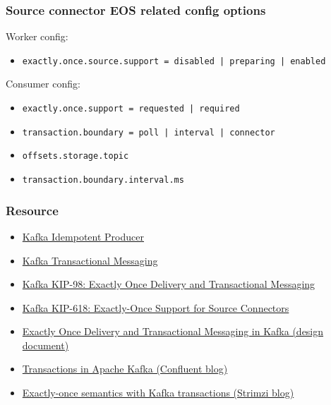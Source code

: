 \documentclass[10pt,utf8]{beamer}
\begin{document}
\begin{frame}
    \frametitle{Source connector EOS related config options}
    Worker config:
    \begin{itemize}
        \item \texttt{exactly.once.source.support = disabled | preparing | enabled}
    \end{itemize}
    
    \vspace{0.5cm}
    
    Consumer config:
    \begin{itemize}
     \item \texttt{exactly.once.support = requested | required}
     \item \texttt{transaction.boundary = poll | interval | connector}
     \item \texttt{offsets.storage.topic}
     \item \texttt{transaction.boundary.interval.ms}
    \end{itemize}
\end{frame}

\begin{frame}
    \frametitle{Resource}
    \begin{itemize}
        \color{blue}
        \item \href{https://cwiki.apache.org/confluence/display/KAFKA/Idempotent+Producer}{Kafka Idempotent Producer}
        \item \href{https://cwiki.apache.org/confluence/display/KAFKA/Transactional+Messaging+in+Kafka}{Kafka Transactional Messaging}
        \item \href{https://cwiki.apache.org/confluence/display/KAFKA/KIP-98+-+Exactly+Once+Delivery+and+Transactional+Messaging}{Kafka KIP-98: Exactly Once Delivery and Transactional Messaging}
        \item \href{https://cwiki.apache.org/confluence/display/KAFKA/KIP-618\%3A+Exactly-Once+Support+for+Source+Connectors}{Kafka KIP-618: Exactly-Once Support for Source Connectors}
        \item \href{https://docs.google.com/document/d/11Jqy\_GjUGtdXJK94XGsEIK7CP1SnQGdp2eF0wSw9ra8/edit\#heading=h.xq0ee1vnpz4o}{Exactly Once Delivery and Transactional Messaging in Kafka (design document)}
        \item \href{https://www.confluent.io/blog/transactions-apache-kafka/}{Transactions in Apache Kafka (Confluent blog)}
        \item \href{https://strimzi.io/blog/2023/05/03/kafka-transactions/}{Exactly-once semantics with Kafka transactions (Strimzi blog)}
        \color{black}
    \end{itemize}
\end{frame}
\end{document}
